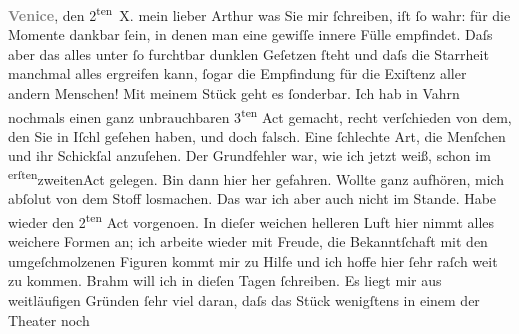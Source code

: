 \begin{ledgroupsized}[t]{13cm}
           \pstart
           \raggedleft{}\textcolor{gray}{\textbf{Venice}}, den 2\textsuperscript{ten} X.\pend
           \pstart{}mein lieber Arthur\pend\pstart
           was Sie mir ſchreiben, iſt ſo wahr: für die Momente dankbar ſein, in denen man eine
               gewiſſe innere Fülle empfindet. Daſs aber das alles unter ſo furchtbar dunklen
               Geſetzen ſteht und daſs die Starrheit manchmal alles ergreifen {\pb}kann, ſogar die Empfindung für die
               Exiſtenz aller andern Menschen!\pend
           \pstart
           Mit meinem Stück geht es
               ſonderbar. Ich hab in Vahrn nochmals einen ganz
               unbrauchbaren 3\textsuperscript{ten} Act gemacht, recht verſchieden von
               dem, den Sie in Iſchl geſehen haben, und doch
               falsch. Eine ſchlechte Art, die Menſchen und ihr Schickſal anzuſehen. Der Grundfehler
               war, wie ich jetzt weiß, schon im \substVorne{}\textsuperscript{erſten}{\allowbreak}\substDazwischen{}zweiten\substHinten{}{ }Act gelegen. Bin dann hier her
               gefahren. Wollte ganz aufhören, mich abſolut von dem Stoff losmachen. Das war ich
               aber auch nicht im Stande. Habe wieder den 2\textsuperscript{ten}{ }Act vorgeno{\geminationm}en. In dieſer weichen helleren Luft hier {\pb}nimmt alles weichere Formen an;
               ich arbeite wieder mit Freude, die Bekanntſchaft mit den umgeſchmolzenen Figuren
               kommt mir zu Hilfe und ich hoffe hier ſehr raſch weit zu kommen.\pend
           \pstart
           Brahm will ich in dieſen Tagen ſchreiben. Es
               liegt mir aus weitläufigen Gründen ſehr viel daran, daſs das Stück wenigſtens in einem der Theater noch

\end{ledgroupsized}
